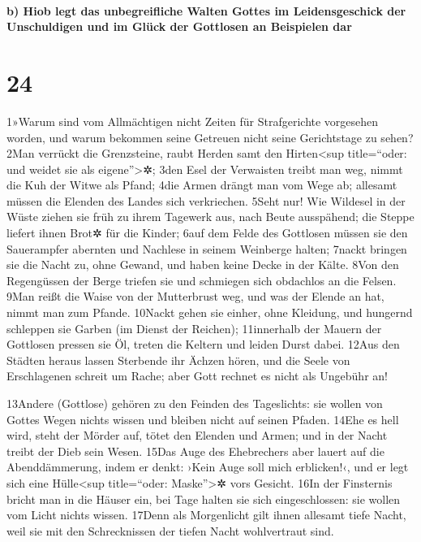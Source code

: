 \hypertarget{b-hiob-legt-das-unbegreifliche-walten-gottes-im-leidensgeschick-der-unschuldigen-und-im-gluxfcck-der-gottlosen-an-beispielen-dar}{%
\paragraph{b) Hiob legt das unbegreifliche Walten Gottes im
Leidensgeschick der Unschuldigen und im Glück der Gottlosen an
Beispielen
dar}\label{b-hiob-legt-das-unbegreifliche-walten-gottes-im-leidensgeschick-der-unschuldigen-und-im-gluxfcck-der-gottlosen-an-beispielen-dar}}

\hypertarget{section-23}{%
\section{24}\label{section-23}}

1»Warum sind vom Allmächtigen nicht Zeiten für Strafgerichte vorgesehen
worden, und warum bekommen seine Getreuen nicht seine Gerichtstage zu
sehen? 2Man verrückt die Grenzsteine, raubt Herden samt den
Hirten\textless sup title=``oder: und weidet sie als
eigene''\textgreater✲; 3den Esel der Verwaisten treibt man weg, nimmt
die Kuh der Witwe als Pfand; 4die Armen drängt man vom Wege ab; allesamt
müssen die Elenden des Landes sich verkriechen. 5Seht nur! Wie Wildesel
in der Wüste ziehen sie früh zu ihrem Tagewerk aus, nach Beute
ausspähend; die Steppe liefert ihnen Brot✲ für die Kinder; 6auf dem
Felde des Gottlosen müssen sie den Sauerampfer abernten und Nachlese in
seinem Weinberge halten; 7nackt bringen sie die Nacht zu, ohne Gewand,
und haben keine Decke in der Kälte. 8Von den Regengüssen der Berge
triefen sie und schmiegen sich obdachlos an die Felsen. 9Man reißt die
Waise von der Mutterbrust weg, und was der Elende an hat, nimmt man zum
Pfande. 10Nackt gehen sie einher, ohne Kleidung, und hungernd schleppen
sie Garben (im Dienst der Reichen); 11innerhalb der Mauern der Gottlosen
pressen sie Öl, treten die Keltern und leiden Durst dabei. 12Aus den
Städten heraus lassen Sterbende ihr Ächzen hören, und die Seele von
Erschlagenen schreit um Rache; aber Gott rechnet es nicht als Ungebühr
an!

13Andere (Gottlose) gehören zu den Feinden des Tageslichts: sie wollen
von Gottes Wegen nichts wissen und bleiben nicht auf seinen Pfaden.
14Ehe es hell wird, steht der Mörder auf, tötet den Elenden und Armen;
und in der Nacht treibt der Dieb sein Wesen. 15Das Auge des Ehebrechers
aber lauert auf die Abenddämmerung, indem er denkt: ›Kein Auge soll mich
erblicken!‹, und er legt sich eine Hülle\textless sup title=``oder:
Maske''\textgreater✲ vors Gesicht. 16In der Finsternis bricht man in die
Häuser ein, bei Tage halten sie sich eingeschlossen: sie wollen vom
Licht nichts wissen. 17Denn als Morgenlicht gilt ihnen allesamt tiefe
Nacht, weil sie mit den Schrecknissen der tiefen Nacht wohlvertraut
sind.

